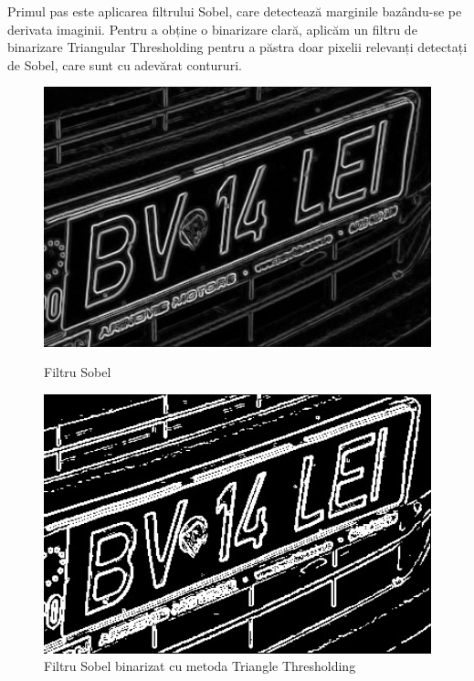 \documentclass[a4paper,12pt]{report}
\begin{document}
Primul pas este aplicarea filtrului Sobel, care detectează marginile bazându-se pe derivata imaginii. Pentru a obține o binarizare clară, aplicăm un filtru de binarizare Triangular Thresholding pentru a păstra doar pixelii relevanți detectați de Sobel, care sunt cu adevărat contururi.

\begin{figure}[h!]
    \centering
    \begin{minipage}{0.4\textwidth}
        \centering
        \includegraphics[width=1\textwidth]{images/sobel.jpg}
        \caption{Filtru Sobel}
    \end{minipage}
    \hspace{0.05\textwidth}
    \begin{minipage}{0.4\textwidth}
        \centering
        \includegraphics[width=1\textwidth]{images/binary_sobel.jpg}
        \caption{Filtru Sobel binarizat cu metoda Triangle Thresholding}
    \end{minipage}
\end{figure}
\FloatBarrier
\end{document}
